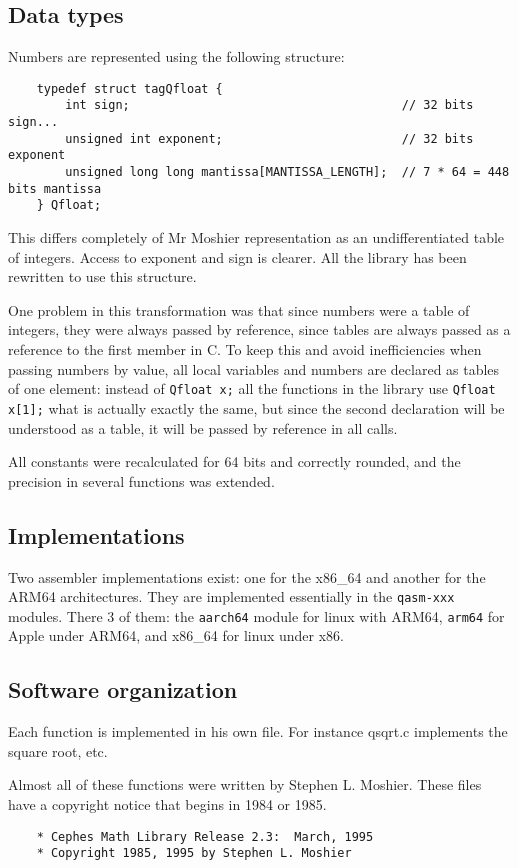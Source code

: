 \documentclass[10pt,a4paper,x11names]{memoir} %
\begin{document}
\subsection{Data types}
Numbers are represented using the following structure:
\begin{lstlisting}
	typedef struct tagQfloat {
		int sign;                                      // 32 bits sign...
		unsigned int exponent;                         // 32 bits exponent
		unsigned long long mantissa[MANTISSA_LENGTH];  // 7 * 64 = 448 bits mantissa
	} Qfloat;
\end{lstlisting}

This differs completely of Mr Moshier representation as an undifferentiated table of integers. Access to exponent
and sign is clearer. All the library has been rewritten to use this structure. 

One problem in this transformation was that since numbers were a table of integers, they were always passed by reference, since tables are always passed as a reference to the first member in C. To keep this and avoid inefficiencies when passing numbers by value, all local variables and numbers are declared as tables of one element: instead of \verb,Qfloat x;, all the functions in the library use \verb,Qfloat x[1];, what is actually exactly the same, but since the second declaration will be understood as a table, it will be passed by reference in all calls.

All constants were recalculated for 64 bits and correctly rounded, and the precision in several functions was extended.
\subsection{Implementations}
Two assembler implementations exist: one for the x86\_64 and another for the ARM64 architectures. They are implemented essentially in the \verb,qasm-xxx, modules. There 3 of them: the \verb,aarch64, module for linux with ARM64, \verb,arm64, for Apple under ARM64, and x86\_64 for linux  under x86.
\subsection{Software organization}
Each function is implemented in  his own file. For instance qsqrt.c implements the square root, etc. 

Almost all of these functions were written by Stephen L. Moshier. These files have a copyright notice that begins in 1984 or 1985.
\begin{verbatim}
	* Cephes Math Library Release 2.3:  March, 1995
	* Copyright 1985, 1995 by Stephen L. Moshier
	
\end{verbatim}
\end{document}
